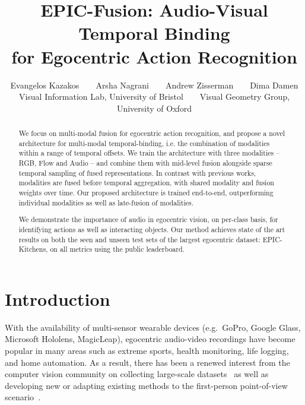 \documentclass[10pt,twocolumn,letterpaper]{article}
\begin{document}
\title{EPIC-Fusion: Audio-Visual Temporal Binding\\ for Egocentric Action Recognition}

\author{Evangelos Kazakos~~~~Arsha Nagrani~~~~Andrew Zisserman~~~~Dima Damen\\
Visual Information Lab, University of Bristol~~~~Visual Geometry Group, University of Oxford\\
}

\maketitle

\ificcvfinal\thispagestyle{empty}\fi
\begin{abstract}

We focus on multi-modal fusion for egocentric action recognition, 
and propose a novel architecture for multi-modal temporal-binding, i.e. the combination of modalities within a range of temporal offsets. We train the architecture with three modalities -- RGB, Flow and Audio -- and combine them with
mid-level fusion alongside sparse temporal sampling of fused representations. 
In contrast with previous works, modalities are fused before temporal aggregation, with shared modality and fusion weights over time.
Our proposed architecture is trained end-to-end, outperforming individual modalities as well as late-fusion of modalities.

We demonstrate the importance of audio in egocentric vision, on per-class basis, for identifying actions as well as interacting objects.
Our method achieves state of the art results on both the seen and unseen test sets of the largest egocentric dataset: EPIC-Kitchens, on all metrics using the public leaderboard.

\end{abstract}

\section{Introduction}
With the availability of multi-sensor wearable devices (e.g.\ GoPro, Google Glass, Microsoft Hololens, MagicLeap), egocentric audio-video recordings have become popular in many areas such as extreme sports, health monitoring, life logging, and home automation.
As a result, there has been a renewed interest from the computer vision community on collecting large-scale datasets~\cite{Damen_2018_ECCV,sigurdsson2018charadesego} as well as developing new or adapting
existing methods to the first-person point-of-view scenario~\cite{zhou2015temporal,Pirsiavash2012,Lee2012,Ma_2016_CVPR,Damen2014a,Yonetani2016}.
\end{document}
